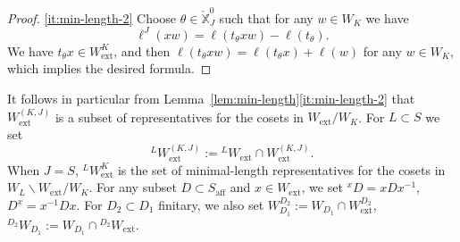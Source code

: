 \documentclass[11pt]{amsart}
\numberwithin{equation}{section}
\theoremstyle{plain}
\theoremstyle{definition}
\newcommand{\X}{{\mathbb X}}
\newcommand{\Xd}{\check{\X}}
\newcommand{\Phis}{\Phi^{\mathrm{s}}}
\newcommand{\ex}{\mathrm{ext}}
\newcommand{\af}{\mathrm{aff}}
\newcommand{\comp}{\mathrm{c}}
\begin{document}
\begin{proof}

\eqref{it:min-length-2}
Choose $\theta \in \Xd_J^0$ such that 
for any $w \in W_K$ we have
\[
\ell^J(xw) = \ell(t_\theta xw)-\ell(t_\theta).
\]
We have $t_\theta x\in W_\ex^{K}$, and then $\ell(t_\theta xw) = \ell(t_\theta x)+\ell(w)$ for any $w \in W_K$, which implies the desired formula.
\end{proof}

It follows in particular from Lemma~\ref{lem:min-length}\eqref{it:min-length-2} that $W_\ex^{(K,J)}$ is a subset of representatives for the cosets in $W_\ex/W_K$. For $L \subset S$ we set 
\[
{}^{L}W_\ex^{(K,J)}:={}^{L}W_\ex\cap W_\ex^{(K,{J})}.
\]
When $J=S$, ${}^{L}W_\ex^{K}$ is the set of minimal-length representatives for the cosets in $W_{L} \backslash W_\ex / W_K$.
For any subset $D \subset S_\af$ and $x\in W_\ex$, we set ${}^x D=xDx^{-1}$, $D^x=x^{-1}Dx$. For $D_2 \subset D_1$ finitary, we also set $W_{D_1}^{D_2} := W_{D_1} \cap W_\ex^{D_2}$, ${}^{D_2} W_{D_1} := W_{D_1} \cap {}^{D_2} W_\ex$.
\end{document}
